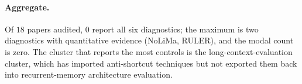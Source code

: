 \documentclass{article}
\begin{document}
\paragraph{Aggregate.}  Of $18$ papers audited, $0$ report all six
diagnostics; the maximum is two diagnostics with quantitative
evidence (NoLiMa, RULER), and the modal count is zero.  The cluster
that reports the most controls is the long-context-evaluation
cluster, which has imported anti-shortcut techniques but not
exported them back into recurrent-memory architecture evaluation.
\end{document}

